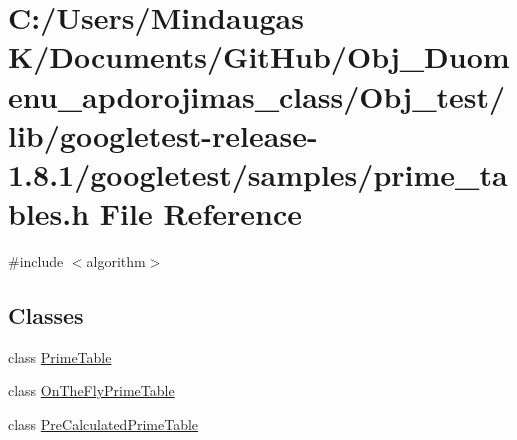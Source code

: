 \hypertarget{_obj__test_2lib_2googletest-release-1_88_81_2googletest_2samples_2prime__tables_8h}{}\section{C\+:/\+Users/\+Mindaugas K/\+Documents/\+Git\+Hub/\+Obj\+\_\+\+Duomenu\+\_\+apdorojimas\+\_\+class/\+Obj\+\_\+test/lib/googletest-\/release-\/1.8.1/googletest/samples/prime\+\_\+tables.h File Reference}
\label{_obj__test_2lib_2googletest-release-1_88_81_2googletest_2samples_2prime__tables_8h}
{\ttfamily \#include $<$algorithm$>$}\newline
\subsection*{Classes}
\begin{DoxyCompactItemize}
\item 
class \mbox{\hyperlink{class_prime_table}{Prime\+Table}}
\item 
class \mbox{\hyperlink{class_on_the_fly_prime_table}{On\+The\+Fly\+Prime\+Table}}
\item 
class \mbox{\hyperlink{class_pre_calculated_prime_table}{Pre\+Calculated\+Prime\+Table}}
\end{DoxyCompactItemize}

